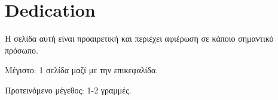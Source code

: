 \chapter*{Dedication}
\thispagestyle{empty}


Η σελίδα αυτή είναι προαιρετική και περιέχει αφιέρωση σε κάποιο
σημαντικό πρόσωπο.

\y\noindent Μέγιστο: 1 σελίδα μαζί με την επικεφαλίδα.

\y\noindent Προτεινόμενο μέγεθος: 1-2 γραμμές.
